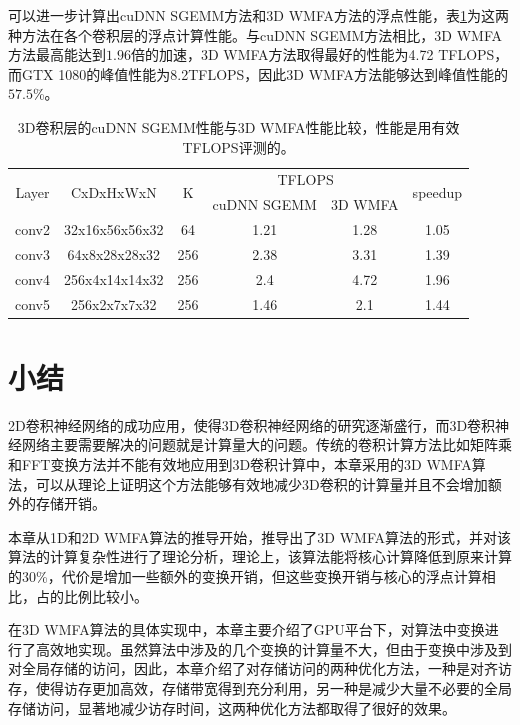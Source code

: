 可以进一步计算出cuDNN SGEMM方法和3D WMFA方法的浮点性能，表\ref{FlopsInfo}为这两种方法在各个卷积层的浮点计算性能。与cuDNN SGEMM方法相比，3D WMFA方法最高能达到$1.96$倍的加速，3D WMFA方法取得最好的性能为4.72 TFLOPS，而GTX 1080的峰值性能为8.2TFLOPS，因此3D WMFA方法能够达到峰值性能的$57.5$\%。

\begin{table}[]
\centering
\caption{3D卷积层的cuDNN SGEMM性能与3D WMFA性能比较，性能是用有效TFLOPS评测的。}
\label{FlopsInfo}
\begin{tabular}{|c|c|c|c|c|c|}
\hline
\multirow{2}{*}{Layer} & \multirow{2}{*}{CxDxHxWxN} & \multirow{2}{*}{K} & \multicolumn{2}{c|}{TFLOPS} & \multirow{2}{*}{speedup} \\ \cline{4-5}
                       &                            &                    & cuDNN SGEMM       & 3D WMFA        &                          \\ \hline
conv2                  & 32x16x56x56x32             & 64                 & 1.21        & 1.28          & 1.05                     \\ \hline
conv3                  & 64x8x28x28x32              & 256                & 2.38        & 3.31          & 1.39                     \\ \hline
conv4                  & 256x4x14x14x32             & 256                & 2.4         & 4.72          & 1.96                     \\ \hline
conv5                  & 256x2x7x7x32               & 256                & 1.46        & 2.1           & 1.44                     \\ \hline
\end{tabular}
\end{table}

\section{小结}
2D卷积神经网络的成功应用，使得3D卷积神经网络的研究逐渐盛行，而3D卷积神经网络主要需要解决的问题就是计算量大的问题。传统的卷积计算方法比如矩阵乘和FFT变换方法并不能有效地应用到3D卷积计算中，本章采用的3D WMFA算法，可以从理论上证明这个方法能够有效地减少3D卷积的计算量并且不会增加额外的存储开销。

本章从1D和2D WMFA算法的推导开始，推导出了3D WMFA算法的形式，并对该算法的计算复杂性进行了理论分析，理论上，该算法能将核心计算降低到原来计算的$30$\%，代价是增加一些额外的变换开销，但这些变换开销与核心的浮点计算相比，占的比例比较小。

在3D WMFA算法的具体实现中，本章主要介绍了GPU平台下，对算法中变换进行了高效地实现。虽然算法中涉及的几个变换的计算量不大，但由于变换中涉及到对全局存储的访问，因此，本章介绍了对存储访问的两种优化方法，一种是对齐访存，使得访存更加高效，存储带宽得到充分利用，另一种是减少大量不必要的全局存储访问，显著地减少访存时间，这两种优化方法都取得了很好的效果。

